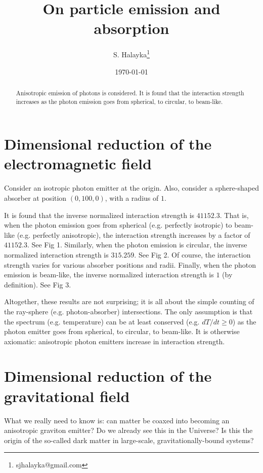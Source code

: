 \documentclass[12pt]{article}
\title{On particle emission and absorption}
\author{S. Halayka\footnote{sjhalayka@gmail.com}}
\date{\today}
\begin{document}
\maketitle

\begin{abstract}
Anisotropic emission of photons is considered.
It is found that the interaction strength increases as the photon emission goes from spherical, to circular, to beam-like.
\end{abstract}



\section{Dimensional reduction of the electromagnetic field}
Consider an isotropic photon emitter at the origin.
Also, consider a sphere-shaped absorber at position $(0, 100, 0)$, with a radius of $1$.

It is found that the inverse normalized interaction strength is $41152.3$.
That is, when the photon emission goes from spherical (e.g. perfectly isotropic) to beam-like (e.g. perfectly anisotropic), the interaction strength increases by a factor of $41152.3$.
See Fig 1.
Similarly, when the photon emission is circular, the inverse normalized interaction strength is $315.259$.
See Fig 2.
Of course, the interaction strength varies for various absorber positions and radii.
Finally, when the photon emission is beam-like, the inverse normalized interaction strength is $1$ (by definition).
See Fig 3.

Altogether, these results are not surprising; it is all about the simple counting of the ray-sphere (e.g. photon-absorber) intersections. 
The only assumption is that the spectrum (e.g. temperature) can be at least conserved (e.g. $dT/dt \geq 0$) as the photon emitter goes from spherical, to circular, to beam-like.
It is otherwise axiomatic: anisotropic photon emitters increase in interaction strength.



\section{Dimensional reduction of the gravitational field}

What we really need to know is: can matter be coaxed into becoming an anisotropic graviton emitter?
Do we already see this in the Universe?
Is this the origin of the so-called dark matter in large-scale, gravitationally-bound systems?
\end{document}
